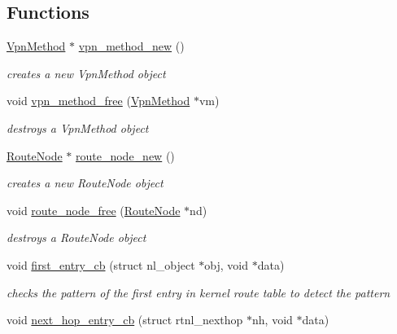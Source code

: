 \subsection*{Functions}
\begin{DoxyCompactItemize}
\item 
\hyperlink{route-tree_8h_a1034dd038389279bf422489d4d99d43a}{Vpn\+Method} $\ast$ \hyperlink{route-tree_8c_a3ccbf1b413fe282c1490701f739273a8}{vpn\+\_\+method\+\_\+new} ()
\begin{DoxyCompactList}\small\item\em creates a new Vpn\+Method object \end{DoxyCompactList}\item 
void \hyperlink{route-tree_8c_a24c2b4e2f6cd24a639b2fe63bb48f48e}{vpn\+\_\+method\+\_\+free} (\hyperlink{route-tree_8h_a1034dd038389279bf422489d4d99d43a}{Vpn\+Method} $\ast$vm)
\begin{DoxyCompactList}\small\item\em destroys a Vpn\+Method object \end{DoxyCompactList}\item 
\hyperlink{route-tree_8h_a1296be44c6672a1adb94ba6dc416682c}{Route\+Node} $\ast$ \hyperlink{route-tree_8c_a941ed51572db1d1d4720f8a329dd0d8b}{route\+\_\+node\+\_\+new} ()
\begin{DoxyCompactList}\small\item\em creates a new Route\+Node object \end{DoxyCompactList}\item 
void \hyperlink{route-tree_8c_a1b80d492072ee18f906bdd2fbaad9b4b}{route\+\_\+node\+\_\+free} (\hyperlink{route-tree_8h_a1296be44c6672a1adb94ba6dc416682c}{Route\+Node} $\ast$nd)
\begin{DoxyCompactList}\small\item\em destroys a Route\+Node object \end{DoxyCompactList}\item 
void \hyperlink{route-tree_8c_ac750dd5c6890dd949d1029d4363fa0e0}{first\+\_\+entry\+\_\+cb} (struct nl\+\_\+object $\ast$obj, void $\ast$data)
\begin{DoxyCompactList}\small\item\em checks the pattern of the first entry in kernel route table to detect the pattern \end{DoxyCompactList}\item 
void \hyperlink{route-tree_8c_a8402c2baca9819b3791b35b6c1645ce6}{next\+\_\+hop\+\_\+entry\+\_\+cb} (struct rtnl\+\_\+nexthop $\ast$nh, void $\ast$data)

\end{DoxyCompactItemize}
